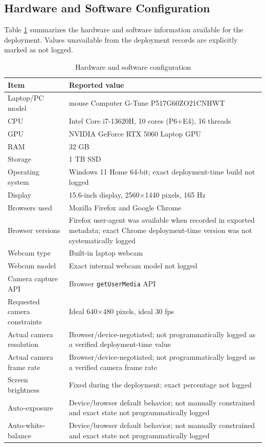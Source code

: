 \documentclass[dvipdfmx]{ehis}
\begin{document}
\subsection{Hardware and Software Configuration}
Table \ref{tab:hardware_config} summarizes the hardware and software information available for the deployment.
Values unavailable from the deployment records are explicitly marked as not logged.

\begin{table}[t]
\caption{Hardware and software configuration}
\label{tab:hardware_config}
\begin{center}
\small
\begin{tabular}{p{}p{}}
\toprule
\textbf{Item} & \textbf{Reported value} \\
\midrule
Laptop/PC model & mouse Computer G-Tune P517G60ZO21CNHWT \\
CPU & Intel Core i7-13620H, 10 cores (P6+E4), 16 threads \\
GPU & NVIDIA GeForce RTX 5060 Laptop GPU \\
RAM & 32 GB \\
Storage & 1 TB SSD \\
Operating system & Windows 11 Home 64-bit; exact deployment-time build not logged \\
Display & 15.6-inch display, 2560$\times$1440 pixels, 165 Hz \\
Browsers used & Mozilla Firefox and Google Chrome \\
Browser versions & Firefox user-agent was available when recorded in exported metadata; exact Chrome deployment-time version was not systematically logged \\
Webcam type & Built-in laptop webcam \\
Webcam model & Exact internal webcam model not logged \\
Camera capture API & Browser \texttt{getUserMedia} API \\
Requested camera constraints & Ideal 640$\times$480 pixels, ideal 30 fps \\
Actual camera resolution & Browser/device-negotiated; not programmatically logged as a verified deployment-time value \\
Actual camera frame rate & Browser/device-negotiated; not programmatically logged as a verified camera frame rate \\
Screen brightness & Fixed during the deployment; exact percentage not logged \\
Auto-exposure & Device/browser default behavior; not manually constrained and exact state not programmatically logged \\
Auto-white-balance & Device/browser default behavior; not manually constrained and exact state not programmatically logged \\
\bottomrule
\end{tabular}
\end{center}
\end{table}
\end{document}
